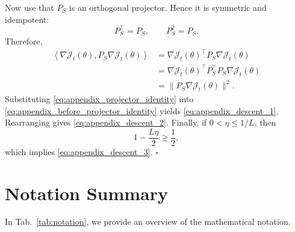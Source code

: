\documentclass{article}
\begin{document}
Now use that $P_S$ is an orthogonal projector. Hence it is symmetric and idempotent:
\begin{equation}
P_S^\top = P_S,
\qquad
P_S^2 = P_S.
\label{eq:appendix_projector_properties}
\end{equation}
Therefore,
\begin{align}
\left\langle \nabla \mathcal{J}_t(\theta), P_S \nabla \mathcal{J}_t(\theta) \right\rangle
&=
\nabla \mathcal{J}_t(\theta)^\top P_S \nabla \mathcal{J}_t(\theta) \\
&=
\nabla \mathcal{J}_t(\theta)^\top P_S^\top P_S \nabla \mathcal{J}_t(\theta) \\
&=
\|P_S \nabla \mathcal{J}_t(\theta)\|^2.
\label{eq:appendix_projector_identity}
\end{align}
Substituting \ref{eq:appendix_projector_identity} into \ref{eq:appendix_before_projector_identity} yields \ref{eq:appendix_descent_1}. Rearranging gives \ref{eq:appendix_descent_2}. Finally, if $0<\eta\le 1/L$, then
\begin{equation}
1-\frac{L\eta}{2}\ge \frac{1}{2},
\end{equation}
which implies \ref{eq:appendix_descent_3}. \hfill $\square$

\newpage

\section{Notation Summary}
In Tab.~\ref{tab:notation}, we provide an overview of the mathematical notation.
\end{document}
